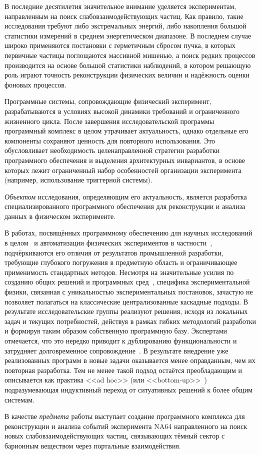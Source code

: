 {\actuality} В последние десятилетия значительное внимание уделяется экспериментам,
направленным на поиск слабовзаимодействующих частиц. Как правило, такие
исследования требуют либо экстремальных энергий, либо накопления большой
статистики измерений в среднем энергетическом диапазоне. В последнем случае
широко применяются постановки с герметичным сбросом пучка, в которых
первичные частицы поглощаются массивной мишенью, а поиск редких процессов
производится на основе большой статистики наблюдений, в котором решающую роль
играют точность реконструкции физических величин и надёжность оценки
фоновых процессов.

Программные системы, сопровождающие физический эксперимент, разрабатываются
в условиях высокой динамики требований и ограниченного жизненного цикла.
После завершения исследовательской программы программный комплекс в целом
утрачивает актуальность, однако отдельные его компоненты сохраняют ценность
для повторного использования. Это обусловливает необходимость целенаправленной
стратегии разработки программного обеспечения и выделения архитектурных
инвариантов, в основе которых лежит ограниченный набор особенностей
организации эксперимента (например, использование триггерной системы).

\emph{Объектом} исследования, определяющим его актуальность, является разработка
специализированного программного обеспечения для реконструкции и анализа
данных в физическом эксперименте.

{\progress} В работах, посвящённых программному обеспечению для научных исследований
в целом~\cite{software-for-science-CarverEtAl2016, lifecycle-lenhardt2014data}
и автоматизации физических экспериментов в частности~\cite{Przedzinski2020PhD},
подчёркиваются его отличия от результатов промышленной разработки, требующие
глубокого погружения в предметную область и ограничивающее применимость
стандартных методов. Несмотря на значительные усилия по созданию общих решений
и программных сред~\cite{gaudi-framework-1, geant4-agostinelli, ROOT-framework, hep-roadmap-Albrecht2019},
специфика экспериментальной физики, связанная с
уникальностью экспериментальных постановок,
зачастую не позволяет полагаться на классические централизованные
каскадные подходы.
В результате исследовательские группы реализуют решения, исходя
из локальных задач и текущих потребностей, действуя в рамках
гибких методологий разработки и формируя таким образом собственную
программную базу. Экспертами отмечается, что это нередко
приводит к дублированию функциональности и затрудняет долговременное
сопровождение~\cite{elmer2018strategicplanscientificsoftware}.
В результате внедрение уже реализованных программ в новые задачи оказывается
менее оправданным, чем их повторная разработка. 
Тем не менее такой подход остаётся преобладающим и описывается
как практика <<ad hoc>> (или <<bottom-up>>~\cite{frameworks-Brun2011})
подразумевающая индуктивный переход от ситуативных решений
к более общим системам.

В качестве \emph{предмета} работы выступает создание
программного комплекса для реконструкции и анализа событий эксперимента
NA64 направленного на поиск новых слабовзаимодействующих частиц,
связывающих тёмный сектор с барионным веществом через портальные
взаимодействия. %